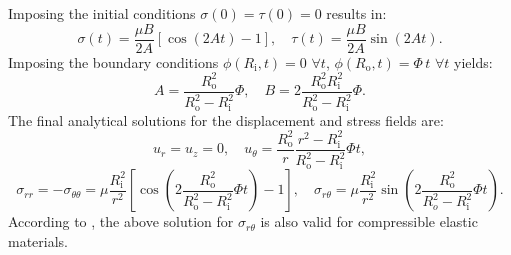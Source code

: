 Imposing the initial conditions $\sigma(0) = \tau(0) = 0$ results in:
\begin{equation}
  \sigma(t) = \frac{\mu B}{2 A} \left[ \cos (2 A t) - 1 \right], \quad \tau(t) = \frac{\mu B}{2 A} \sin (2 A t).
\end{equation}
Imposing the boundary conditions $\phi(R_{\mathrm i},t) = 0 \, \, \forall t$, $\phi(R_{\mathrm o},t) = \Phi \, t \, \, \forall t$ yields:
\begin{equation}
  A = \frac{R_{\mathrm o}^{2}}{R_{\mathrm o}^{2} - R_{\mathrm i}^{2}} \Phi, \quad B = 2 \frac{R_{\mathrm o}^{2} R_{\mathrm i}^{2}}{R_{\mathrm o}^{2} - R_{\mathrm i}^{2}} \Phi.
\end{equation}
The final analytical solutions for the displacement and stress fields are:
\begin{equation}
  u_r = u_z = 0, \quad u_\theta = \frac{R_{\mathrm o}^2}{r} \frac{r^2 - R_{\mathrm i}^2}{R_{\mathrm o}^{2} - R_{\mathrm i}^{2}} \Phi t,
\end{equation}
\begin{equation}
  \sigma_{rr} = - \sigma_{\theta \theta} = \mu \frac{R_{\mathrm i}^{2}}{r^{2}} \left[ \cos \left( 2 \frac{R_{\mathrm o}^{2}}{R_{\mathrm o}^{2} - R_{\mathrm i}^{2}} \Phi t \right) - 1 \right], \quad \sigma_{r \theta} = \mu \frac{R_{\mathrm i}^{2}}{r^{2}} \sin \left( 2 \frac{R_{\mathrm o}^{2}}{R_o^{2} - R_{\mathrm i}^{2}} \Phi t \right).
\end{equation}
According to \cite{Brannon:11}, the above solution for $\sigma_{r \theta}$ is also valid for compressible elastic materials.